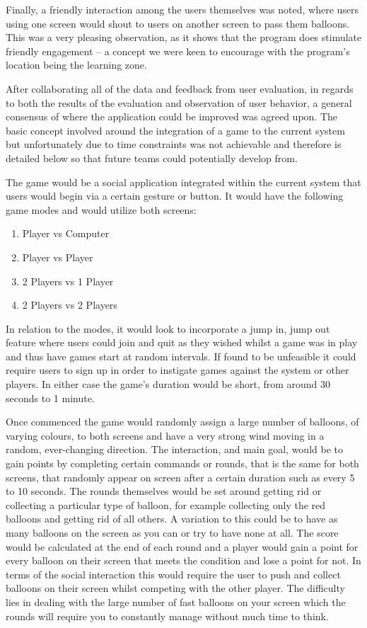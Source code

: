 Finally, a friendly interaction among the users themselves was noted, where users using one screen would shout to users on another screen to pass them balloons. This was a very pleasing observation, as it shows that the program does stimulate friendly engagement -- a concept we were keen to encourage with the program's location being the learning zone.


After collaborating all of the data and feedback from user evaluation, in regards to both the results of the evaluation and observation of user behavior, a general consensus of where the application could be improved was agreed upon. The basic concept involved around the integration of a game to the current system but unfortunately due to time constraints was not achievable and therefore is detailed below so that future teams could potentially develop from.

The game would be a social application integrated within the current system that users would begin via a certain gesture or button. It would have the following game modes and would utilize both screens:

\begin{enumerate}
	\item Player vs Computer
	\item Player vs Player 
	\item 2 Players vs 1 Player
	\item 2 Players vs 2 Players
\end{enumerate}

In relation to the modes, it would look to incorporate a jump in, jump out feature where users could join and quit as they wished whilst a game was in play and thus have games start at random intervals. If found to be unfeasible it could require users to sign up in order to instigate games against the system or other players. In either case the game's duration would be short, from around 30 seconds to 1 minute.

Once commenced the game would randomly assign a large number of balloons, of varying colours, to both screens and have a very strong wind moving in a random, ever-changing direction. The interaction, and main goal, would be to gain points by completing certain commands or rounds, that is the same for both screens, that randomly appear on screen after a certain duration such as every 5 to 10 seconds. The rounds themselves would be set around getting rid or collecting a particular type of balloon, for example collecting only the red balloons and getting rid of all others. A variation to this could be to have as many balloons on the screen as you can or try to have none at all. The score would be calculated at the end of each round and a player would gain a point for every balloon on their screen that meets the condition and lose a point for not. In terms of the social interaction this would require the user to push and collect balloons on their screen whilst competing with the other player. The difficulty lies in dealing with the large number of fast balloons on your screen which the rounds will require you to constantly manage without much time to think.

